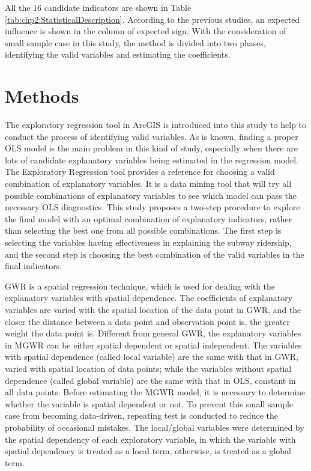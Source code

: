 %
All the 16 candidate indicators are shown in Table \ref{tab:chp2:StatisticalDescription}. According to the previous studies, an expected influence is shown in the column of expected sign. With the consideration of small sample case in this study, the method is divided into two phases, identifying the valid variables and estimating the coefficients.

%
\section{Methods}
%
The exploratory regression tool in ArcGIS is introduced into this study to help to conduct the process of identifying valid variables. As is known, finding a proper OLS model is the main problem in this kind of study, especially when there are lots of candidate explanatory variables being estimated in the regression model. The Exploratory Regression tool provides a reference for choosing a valid combination of explanatory variables. It is a data mining tool that will try all possible combinations of explanatory variables to see which model can pass the necessary OLS diagnostics. This study proposes a two-step procedure to explore the final model with an optimal combination of explanatory indicators, rather than selecting the best one from all possible combinations. The first step is selecting the variables having effectiveness in explaining the subway ridership, and the second step is choosing the best combination of the valid variables in the final indicators.

%
GWR is a spatial regression technique, which is used for dealing with the explanatory variables with spatial dependence. The coefficients of explanatory variables are varied with the spatial location of the data point in GWR, and the closer the distance between a data point and observation point is, the greater weight the data point is. Different from general GWR, the explanatory variables in MGWR can be either spatial dependent or spatial independent. The variables with spatial dependence (called local variable) are the same with that in GWR, varied with spatial location of data points; while the variables without spatial dependence (called global variable) are the same with that in OLS, constant in all data points. Before estimating the MGWR model, it is necessary to determine whether the variable is spatial dependent or not. To prevent this small sample case from becoming data-driven, repeating test is conducted to reduce the probability of occasional mistakes. The local/global variables were determined by the spatial dependency of each exploratory variable, in which the variable with spatial dependency is treated as a local term, otherwise, is treated as a global term.

